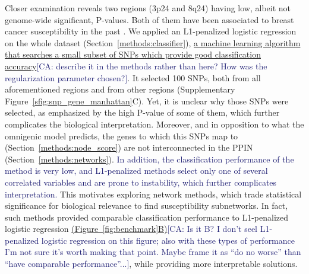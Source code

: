 \documentclass[twocolumn, 11pt]{article}
\newcommand{\cazcom}[2]{{\uline{#1}}\unskip\space\textcolor{MidnightBlue}{[CA: #2]}}
\newcommand{\caz}[2]{{\sout{#1}}\unskip\space\textcolor{MidnightBlue}{#2}}
\begin{document}
Closer examination reveals two regions (3p24 and 8q24) having low, albeit not genome-wide significant, P-values. Both of them have been associated to breast cancer susceptibility in the past \cite{brisbin_meta-analysis_2011,search_newly_2009}. We applied an L1-penalized logistic regression on the whole dataset (Section~\ref{methods:classifier}), \cazcom{a machine learning algorithm that searches a small subset of SNPs which provide good classification accuracy}{describe it in the methods rather than here? How was the regularization parameter chosen?}. It selected 100 SNPs, both from all aforementioned regions and from other regions (Supplementary Figure~\ref{sfig:snp_gene_manhattan}C). Yet, it is unclear why those SNPs were selected, as emphasized by the high P-value of some of them, which further complicates the biological interpretation. Moreover, and in opposition to what the omnigenic model predicts, the genes to which this SNPs map to (Section~\ref{methods:node_score}) are not interconnected in the PPIN (Section~\ref{methods:networks}). \caz{}{In addition, the classification performance of the method is very low, and L1-penalized methods select only one of several correlated variables and are prone to instability, which further complicates interpretation.} This motivates exploring network methods, which trade statistical significance for biological relevance to find susceptibility subnetworks. In fact, such methods provided comparable classification performance to L1-penalized logistic regression \cazcom{(Figure~\ref{fig:benchmark}B)}{Is it B? I don't seel L1-penalized logistic regression on this figure; also with these types of performance I'm not sure it's worth making that point. Maybe frame it as ``do no worse'' than ``have comparable performance''...}, while providing more interpretable solutions. 
\end{document}
